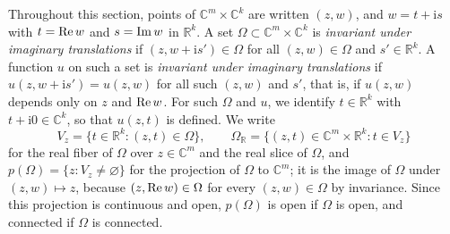 Throughout this section, points of $\mathbb{C}^m\times\mathbb{C}^k$ are written $(z,w)$, and $w=t+\mathrm{i}s$ with $t=\operatorname{Re} w$ and $s=\operatorname{Im} w$ in $\mathbb R^k$. A set $\Omega\subset\mathbb{C}^m\times\mathbb{C}^k$ is \emph{invariant under imaginary translations} if $(z,w+\mathrm{i}s')\in\Omega$ for all $(z,w)\in\Omega$ and $s'\in\mathbb R^k$. A function $u$ on such a set is \emph{invariant under imaginary translations} if $u(z,w+\mathrm{i}s')=u(z,w)$ for all such $(z,w)$ and $s'$, that is, if $u(z,w)$ depends only on $z$ and $\operatorname{Re} w$. For such $\Omega$ and $u$, we identify $t\in\mathbb R^k$ with $t+\mathrm{i}0\in\mathbb{C}^k$, so that $u(z,t)$ is defined. We write
\[
 V_z=\{t\in\mathbb R^k:(z,t)\in\Omega\},\qquad
 \Omega_{\mathbb R}=\{(z,t)\in\mathbb{C}^m\times\mathbb R^k:t\in V_z\}
\]
for the real fiber of $\Omega$ over $z\in\mathbb{C}^m$ and the real slice of $\Omega$, and $p(\Omega)=\{z:V_z\neq\varnothing\}$ for the projection of $\Omega$ to $\mathbb{C}^m$; it is the image of $\Omega$ under $(z,w)\mapsto z$, because $(z,\operatorname{Re} w)\in\Omega$ for every $(z,w)\in\Omega$ by invariance. Since this projection is continuous and open, $p(\Omega)$ is open if $\Omega$ is open, and connected if $\Omega$ is connected.

